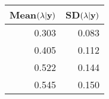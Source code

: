 \begin{table}[ht]
\centering
\begin{tabular}{rr}
  \hline
Mean$(\lambda | \mathbf{y})$ & SD$(\lambda | \mathbf{y})$ \\ 
  \hline
0.303 & 0.083 \\ 
  0.405 & 0.112 \\ 
  0.522 & 0.144 \\ 
  0.545 & 0.150 \\ 
   \hline
\end{tabular}
\end{table}
